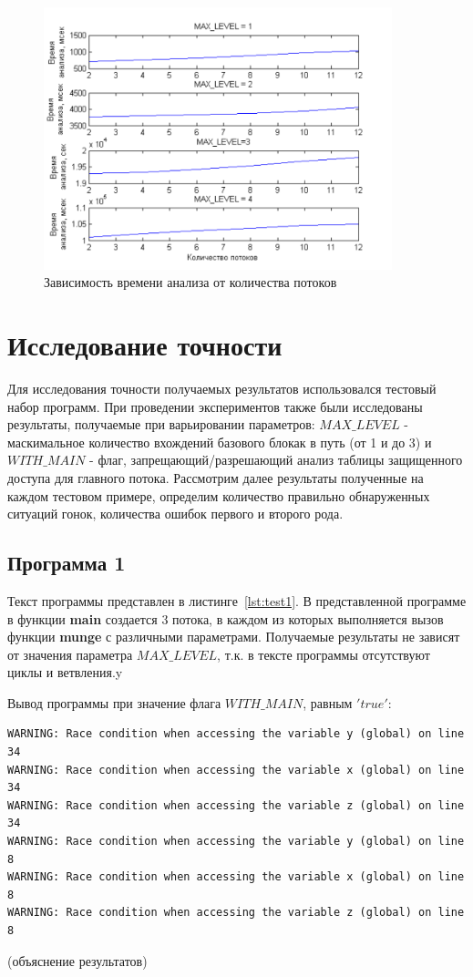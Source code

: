 \begin{figure}[ht]
  \centering
  \includegraphics[width=0.9\textwidth]{inc/png/graphic5}
  \caption{Зависимость времени анализа от количества потоков}
  \label{fig:graphic5}
\end{figure}


\section{Исследование точности}

Для исследования точности получаемых результатов использовался тестовый набор программ. При проведении экспериментов также были исследованы результаты, получаемые при варьировании параметров: $MAX\_LEVEL$ - маскимальное количество вхождений базового блокак в путь (от 1 и до 3)  и $WITH\_MAIN$ - флаг, запрещающий/разрешающий анализ таблицы защищенного доступа для главного потока. Рассмотрим далее результаты полученные на каждом тестовом примере, определим количество правильно обнаруженных ситуаций гонок, количества ошибок первого и второго рода.

\subsection{Программа 1}

Текст программы представлен в листинге~\ref{lst:test1}. В представленной программе в функции \textbf{main} создается 3 потока, в каждом из которых выполняется вызов функции \textbf{munge} с различными параметрами. Получаемые результаты не зависят от значения параметра $MAX\_LEVEL$, т.к. в тексте программы отсутствуют циклы и ветвления.y

Вывод программы при значение флага $WITH\_MAIN$, равным $'true'$:
\begin{verbatim}
WARNING: Race condition when accessing the variable y (global) on line 34
WARNING: Race condition when accessing the variable x (global) on line 34
WARNING: Race condition when accessing the variable z (global) on line 34
WARNING: Race condition when accessing the variable y (global) on line 8
WARNING: Race condition when accessing the variable x (global) on line 8
WARNING: Race condition when accessing the variable z (global) on line 8
\end{verbatim}
(объяснение результатов)

